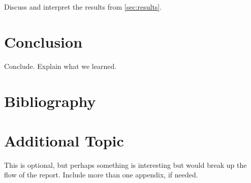 \documentclass[letterpaper]{article}
\begin{document}
Discuss and interpret the results from \cref{sec:results}.

\lipsum[3]

\section{Conclusion}
\label{sec:conclusion}

Conclude. Explain what we learned.

\lipsum[2]


\section*{Bibliography}
\printbibliography[heading=none]

\appendix

\section{Additional Topic}
\label{app:1}

This is optional, but perhaps something is interesting but would break up the flow of the report. Include more than one appendix, if needed.

\lipsum[8]
	
\end{document}

